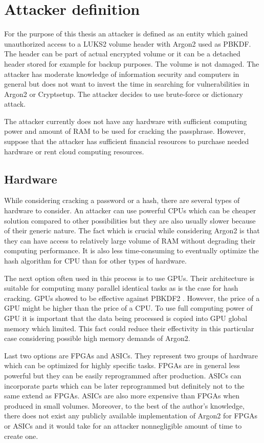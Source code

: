 \documentclass[nolof]{fithesis3}
\begin{document}
\section{Attacker definition}
\label{sec:attacker}
For the purpose of this thesis an attacker is defined as an entity which gained unauthorized access to a LUKS2 volume header with Argon2 used as PBKDF. The header can be part of actual encrypted volume or it can be a detached header stored for example for backup purposes. The volume is not damaged. The attacker has moderate knowledge of information security and computers in general but does not want to invest the time in searching for vulnerabilities in Argon2 or Cryptsetup. The attacker decides to use brute-force or dictionary attack.

The attacker currently does not have any hardware with sufficient computing power and amount of RAM to be used for cracking the passphrase. However, suppose that the attacker has sufficient financial resources to purchase needed hardware or rent cloud computing resources.

\subsection{Hardware}
While considering cracking a password or a hash, there are several types of hardware to consider. An attacker can use powerful CPUs which can be cheaper solution compared to other possibilities but they are also usually slower because of their generic nature. The fact which is crucial while considering Argon2 is that they can have access to relatively large volume of RAM without degrading their computing performance. It is also less time-consuming to eventually optimize the hash algorithm for CPU than for other types of hardware.

The next option often used in this process is to use GPUs. Their architecture is suitable for computing many parallel identical tasks as is the case for hash cracking. GPUs showed to be effective against PBKDF2 \parencite{mosnacek}. However, the price of a GPU might be higher than the price of a CPU. To use full computing power of GPU it is important that the data being processed is copied into GPU global memory which limited. This fact could  reduce their effectivity in this particular case considering possible high memory demands of Argon2.

Last two options are FPGAs and ASICs. They represent two groups of hardware which can be optimized for highly specific tasks. FPGAs are in general less powerful but they can be easily reprogrammed after production. ASICs can incorporate parts which can be later reprogrammed but definitely not to the same extend as FPGAs. ASICs are also more expensive than FPGAs when produced in small volumes. Moreover, to the best of the author's knowledge, there does not exist any publicly available implementation of Argon2 for FPGAs or ASICs and it would take for an attacker nonnegligible amount of time to create one.
\end{document}
